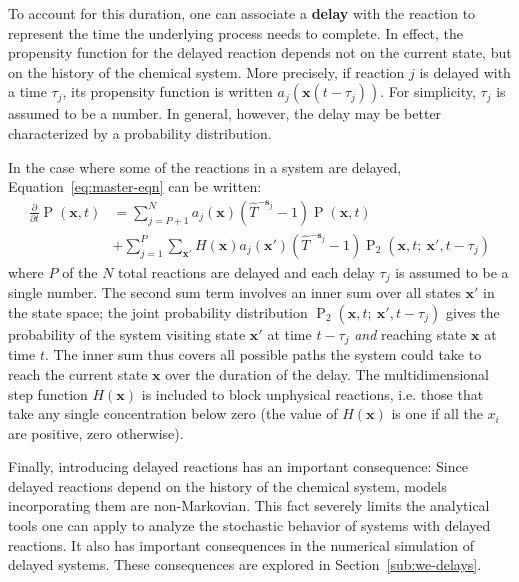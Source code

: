 \documentclass[english,letterpaper,12pt]{report}
\newcommand{\defkeywd}[1]{\textbf{#1}}
\renewcommand{\vec}[1]{\ensuremath{\mathbf{#1}}}
\DeclareMathOperator{\Prob}{P}
\newcommand{\delaytime}{\ensuremath{\tau}}
\begin{document}
\begin{doublespacing}
To account for this duration, one can associate a \defkeywd{delay} with the reaction to represent the time the underlying process needs to complete. In effect, the propensity function for the delayed reaction depends not on the current state, but on the history of the chemical system. More precisely, if reaction $j$ is delayed with a time $\delaytime_j$, its propensity function is written $a_j \left(\vec{x}(t - \delaytime_j) \right)$. For simplicity, $\delaytime_j$ is assumed to be a number. In general, however, the delay may be better characterized by a probability distribution.

In the case where some of the reactions in a system are delayed, Equation~\eqref{eq:master-eqn} can be written:
\begin{align}
    \frac{\partial}{\partial t} \Prob(\vec{x}, t) &= \sum_{j=P+1}^N a_j(\vec{x})(\hat{T}^{-\vec{s}_j} - 1)\Prob(\vec{x}, t) \\
                                                  &+ \sum_{j=1}^P \sum_{\vec{x}'} H(\vec{x}) a_j(\vec{x}') (\hat{T}^{-\vec{s}_j} - 1) \Prob_2(\vec{x}, t;\: \vec{x}', t - \delaytime_j)
    \label{eq:master-eqn-delay}
\end{align}
where $P$ of the $N$ total reactions are delayed and each delay $\delaytime_j$ is assumed to be a single number. The second sum term involves an inner sum over all states $\vec{x}'$ in the state space; the joint probability distribution $\Prob_2(\vec{x}, t;\: \vec{x}', t - \delaytime_j)$ gives the probability of the system visiting state $\vec{x}'$ at time $t - \delaytime_j$ \emph{and} reaching state $\vec{x}$ at time $t$. The inner sum thus covers all possible paths the system could take to reach the current state $\vec{x}$ over the duration of the delay. The multidimensional step function $H(\vec{x})$ is included to block unphysical reactions, i.e. those that take any single concentration below zero (the value of $H(\vec{x})$ is one if all the $x_i$ are positive, zero otherwise). 

Finally, introducing delayed reactions has an important consequence: Since delayed reactions depend on the history of the chemical system, models incorporating them are non-Markovian. This fact severely limits the analytical tools one can apply to analyze the stochastic behavior of systems with delayed reactions. It also has important consequences in the numerical simulation of delayed systems. These consequences are explored in Section~\ref{sub:we-delays}.



\end{doublespacing}
\end{document}
